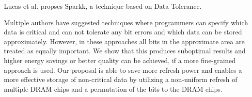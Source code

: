Lucas et al. \cite{sparkk} propses Sparkk, a technique based on Data Tolerance.

Multiple authors have suggested techniques where programmers can specify which data is critical and can not tolerate any bit errors and which data can be stored approximately. However, in these approaches all bits in the approximate area are treated as equally important. We show that this produces suboptimal results and higher energy savings or better quality can be achieved, if a more fine-grained approach is used. Our proposal is able to save more refresh power and enables a more effective storage of non-critical data by utilizing a non-uniform refresh of multiple DRAM chips and a permutation of the bits to the DRAM chips. 
